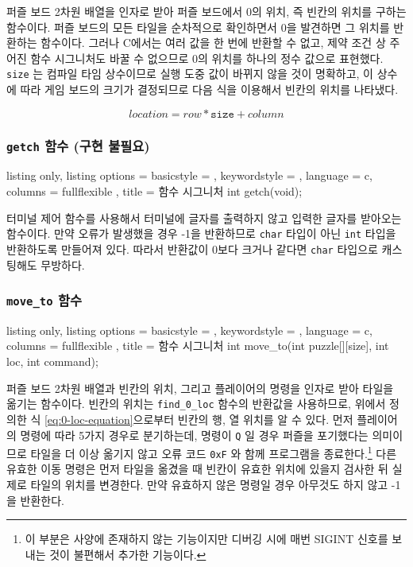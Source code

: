 \documentclass{article}
\newcommand{\code}[1]{
  \texttt{\large{#1}}
}
\begin{document}
퍼즐 보드 2차원 배열을 인자로 받아 퍼즐 보드에서 0의 위치, 즉 빈칸의 위치를 구하는 함수이다. 퍼즐 보드의 모든 타일을 순차적으로 확인하면서 0을 발견하면 그 위치를 반환하는 함수이다. 그러나 C에서는 여러 값을 한 번에 반환할 수 없고, 제약 조건 상 주어진 함수 시그니처도 바꿀 수 없으므로 0의 위치를 하나의 정수 값으로 표현했다. \code{size}는 컴파일 타임 상수이므로 실행 도중 값이 바뀌지 않을 것이 명확하고, 이 상수에 따라 게임 보드의 크기가 결정되므로 다음 식을 이용해서 빈칸의 위치를 나타냈다.

\begin{equation}
  \label{eq:0-loc-equation}
  location = row * \texttt{size} + column
\end{equation}

\subsubsection{\code{getch} 함수 (구현 불필요)}

\begin{tcblisting}{
    listing only,
    listing options = {
      basicstyle = \ttfamily,
      keywordstyle = \color{blue},
      language = c,
      columns = fullflexible
    },
    title = 함수 시그니처
  }int getch(void);
\end{tcblisting}

터미널 제어 함수를 사용해서 터미널에 글자를 출력하지 않고 입력한 글자를 받아오는 함수이다. 만약 오류가 발생했을 경우 -1을 반환하므로 \code{char} 타입이 아닌 \code{int} 타입을 반환하도록 만들어져 있다. 따라서 반환값이 0보다 크거나 같다면 \code{char} 타입으로 캐스팅해도 무방하다.

\subsubsection{\code{move\_to} 함수}

\begin{tcblisting}{
    listing only,
    listing options = {
      basicstyle = \ttfamily,
      keywordstyle = \color{blue},
      language = c,
      columns = fullflexible
    },
    title = 함수 시그니처
  }int move_to(int puzzle[][size], int loc, int command);
\end{tcblisting}

퍼즐 보드 2차원 배열과 빈칸의 위치, 그리고 플레이어의 명령을 인자로 받아 타일을 옮기는 함수이다. 빈칸의 위치는 \code{find\_0\_loc} 함수의 반환값을 사용하므로, 위에서 정의한 식 \ref{eq:0-loc-equation}으로부터 빈칸의 행, 열 위치를 알 수 있다. 먼저 플레이어의 명령에 따라 5가지 경우로 분기하는데, 명령이 \code{Q}일 경우 퍼즐을 포기했다는 의미이므로 타일을 더 이상 옮기지 않고 오류 코드 \code{0xF}와 함께 프로그램을 종료한다.\footnote{이 부분은 사양에 존재하지 않는 기능이지만 디버깅 시에 매번 SIGINT 신호를 보내는 것이 불편해서 추가한 기능이다.} 다른 유효한 이동 명령은 먼저 타일을 옮겼을 때 빈칸이 유효한 위치에 있을지 검사한 뒤 실제로 타일의 위치를 변경한다. 만약 유효하지 않은 명령일 경우 아무것도 하지 않고 -1을 반환한다.
\end{document}
